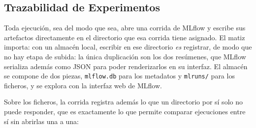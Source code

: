\subsection{Trazabilidad de Experimentos}
\label{sec:experiment_tracking}

Toda ejecución, sea del modo que sea, abre una corrida de MLflow y escribe sus artefactos
directamente en el directorio que esa corrida tiene asignado. El matiz importa: con un almacén
local, escribir en ese directorio \emph{es} registrar, de modo que no hay etapa de subida: la
única duplicación son los dos resúmenes, que MLflow serializa además como JSON para poder
renderizarlos en su interfaz. El almacén se compone de dos piezas, \texttt{mlflow.db} para los
metadatos y \texttt{mlruns/} para los ficheros, y se explora con la interfaz web de MLflow.

Sobre los ficheros, la corrida registra además lo que un directorio por sí solo no puede
responder, que es exactamente lo que permite comparar ejecuciones entre sí sin abrirlas una a una:

